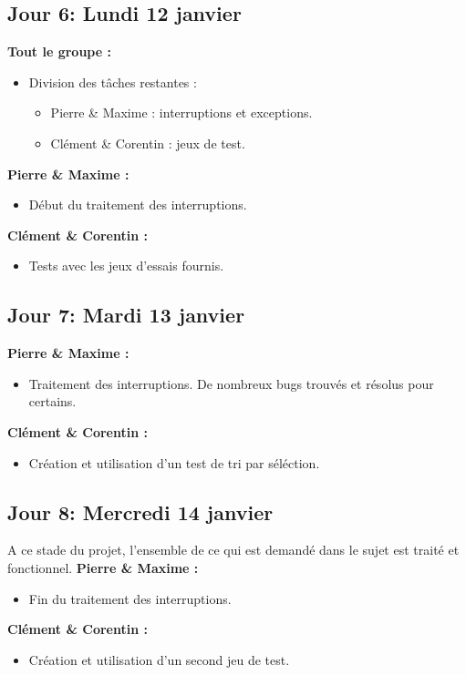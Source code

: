 \documentclass[11pt]{article} %
\begin{document}
\subsection{Jour 6: Lundi 12  janvier}
\textbf{Tout le groupe :}
\begin{itemize}
  \item Division des t\^aches restantes :
  \begin{itemize}
    \item Pierre \& Maxime : interruptions et exceptions.
    \item Cl\'ement \& Corentin : jeux de test.
  \end{itemize}
\end{itemize}
\textbf{Pierre \& Maxime :}
\begin{itemize}
  \item Début du traitement des interruptions.
\end{itemize}
\textbf{Cl\'ement \& Corentin :}
\begin{itemize}
  \item Tests avec les jeux d'essais fournis.
\end{itemize}

\subsection{Jour 7: Mardi 13  janvier}
\textbf{Pierre \& Maxime :}
\begin{itemize}
  \item Traitement des interruptions. De nombreux bugs trouvés et résolus pour certains.
\end{itemize}
\textbf{Cl\'ement \& Corentin :}
\begin{itemize}
  \item Création et utilisation d'un test de tri par s\'el\'ection. 
\end{itemize}

\subsection{Jour 8: Mercredi 14 janvier}
A ce stade du projet, l'ensemble de ce qui est demand\'e dans le sujet est trait\'e et fonctionnel.
\newline
\newline
\textbf{Pierre \& Maxime :}
\begin{itemize}
  \item Fin du traitement des interruptions.
\end{itemize}
\textbf{Cl\'ement \& Corentin :}
\begin{itemize}
  \item Création et utilisation d'un second jeu de test.
\end{itemize}
\end{document}
